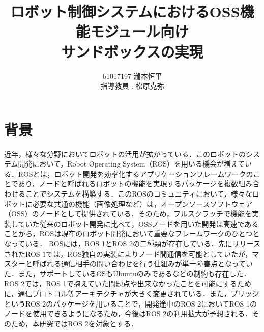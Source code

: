 \documentclass[11pt]{ujarticle} %
\author{
b1017197 瀧本恒平\\指導教員 : 松原克弥
}
\title{ロボット制御システムにおけるOSS機能モジュール向け\\サンドボックスの実現}
\begin{document}
\maketitle

\section{背景}
近年，様々な分野においてロボットの活用が拡がっている\cite{Pepper}\cite{RoBoHoN}．このロボットのシステム開発において，Robot Operating System（ROS）を用いる機会が増えている．ROSとは，ロボット開発を効率化するアプリケーションフレームワークのことであり，ノードと呼ばれるロボットの機能を実現するパッケージを複数組み合わせることでシステムを構築する．このROSのコミュニティにおいて，様々なロボットに必要な共通の機能（画像処理\cite{ROSexample}など）は，オープンソースソフトウェア（OSS）のノードとして提供されている．そのため，フルスクラッチで機能を実装していた従来のロボット開発に比べて，OSSノードを用いた開発は高速であることから，ROSは現在のロボット開発において重要なフレームワークのひとつとなっている．
ROSには，ROS 1とROS 2の二種類が存在している．先にリリースされたROS 1では，ROS独自の実装によりノード間通信を可能としていたが，マスターと呼ばれる通信相手の問い合わせを行う仕組みが単一障害点となっていた．また，サポートしているOSもUbuntuのみであるなどの制約も存在した．ROS 2では，ROS 1で抱えていた問題点や出来なかったことを可能にするために，通信プロトコル等アーキテクチャが大きく変更されている．また，ブリッジというROS 2のパッケージを用いることで，開発途中のROS 2においてROS 1のノードを使用できるようになるため，今後はROS 2の利用拡大が予想される．そのため，本研究ではROS 2を対象とする．
\end{document}
